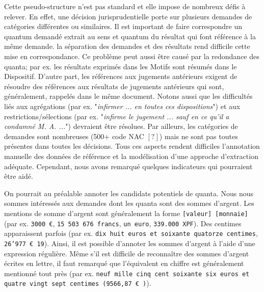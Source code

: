  Cette pseudo-structure n'est pas standard et elle impose de nombreux défis à relever. En effet, une décision jurisprudentielle porte sur plusieurs demandes de catégories différentes ou similaires. Il est important de faire correspondre un quantum demandé extrait au sens et quantum du résultat qui font référence à la même demande. la séparation des demandes et des résultats rend difficile cette mise en correspondance. Ce problème peut aussi être causé par la redondance des quanta; par ex. les résultats exprimés dans les Motifs sont résumés dans le Dispositif. D'autre part, les références aux jugements antérieurs exigent de résoudre des références aux résultats de jugements antérieurs qui sont, généralement, rappelés dans le même document. Notons aussi que les difficultés liés aux agrégations (par ex. "\textit{infirmer ... en toutes ces dispositions}") et aux restrictions/sélections (par ex. "\textit{infirme le jugement ... sauf en ce qu'il a condamné M. A. ...}") devraient être résolues. Par ailleurs, les catégories de demandes sont nombreuses (500+ code NAC $[?]$) mais ne sont pas toutes présentes dans toutes les décisions. Tous ces aspects rendent difficiles l'annotation manuelle des données de référence et la modélisation d'une approche d'extraction adéquate. Cependant, nous avons remarqué quelques indicateurs qui pourraient être aidé.

On pourrait au préalable annoter les candidats potentiels de quanta. Nous nous sommes intéressés aux demandes dont les quanta sont des sommes d'argent. Les mentions de somme d'argent sont généralement la forme \og \texttt{[valeur] [monnaie]} \fg{} (par ex. \texttt{3000 \euro}, \texttt{15 503 676 francs}, \texttt{un euro}, \texttt{339.000 XPF}). Des centimes apparaissent parfois (par ex. \texttt{dix huit euros et soixante quatorze centimes}, \texttt{26'977 \euro{}  19}).  Ainsi, il est possible d'annoter les sommes d'argent à l'aide d'une expression régulière. Même s'il est difficile de reconnaître des sommes d'argent écrites en lettre, il faut remarqué que l'équivalent en chiffre est généralement mentionné tout près (par ex. \texttt{neuf mille cinq cent soixante six euros et quatre vingt sept centimes (9566,87 \euro{}  )}). 

